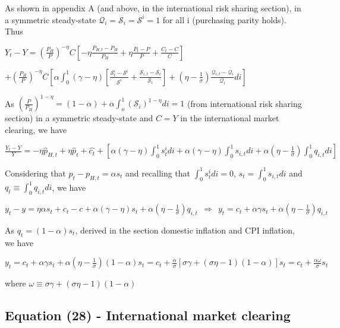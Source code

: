 \documentclass[
]{article}
\begin{document}
As shown in appendix A (and above, in the international risk sharing
section), in a symmetric steady-state
\(\mathcal{Q}_i=\mathcal{S}_i=\mathcal{S}^i=1\) for all i (purchasing
parity holds). Thus

\(\displaystyle Y_t-Y = \left( \frac{P_H}{P} \right)^{-\eta}C \left[ -\eta \frac{P_{H,t}-P_H}{P_H} +\eta \frac{P_{t}-P}{P} + \frac{C_t-C}{C} \right]\)

\(\displaystyle +\left( \frac{P_H}{P} \right)^{-\eta} C \left[\alpha \int_0^1 (\gamma-\eta) \left[ \frac{ \mathcal{S}_{t}^i-\mathcal{S}^i }{\mathcal{S}^i} + \frac{ \mathcal{S}_{i,t}-\mathcal{S}_i }{\mathcal{S}_i}\right] + \left(\eta-\frac{1}{\sigma} \right) \frac{\mathcal{Q}_{i,t}-\mathcal{Q}_i}{\mathcal{Q}_i} di \right]\)

As
\(\displaystyle \left( \frac{P}{P_H} \right)^{1-\eta}=(1-\alpha)+\alpha \int_o^1(\mathcal{S}_i)^{1-\eta}di =1\)
(from international risk sharing section) in a symmetric steady-state
and \(C=Y\) in the international market clearing, we have

\(\displaystyle \frac{Y_t-Y}{Y} = -\eta \hat{p}_{H,t} +\eta \hat{p}_t + \hat{c_t} + \left[\alpha (\gamma-\eta) \int_0^1 s_t^i di + \alpha (\gamma-\eta) \int_0^1 s_{i,t}di + \alpha\left(\eta-\frac{1}{\sigma} \right) \int_0^1 q_{i,t} di \right]\)

Considering that \(p_t-p_{H,t}=\alpha s_t\) and recalling that
\(\displaystyle \int_0^1s_t^idi=0\),
\(\displaystyle s_t= \int_0^1s_{i,t}di\) and
\(\displaystyle q_t \equiv \int_0^1 q_{i,t}di\), we have

\(\displaystyle y_t-y = \eta \alpha s_t +c_t-c + \alpha (\gamma-\eta) s_t + \alpha\left(\eta-\frac{1}{\sigma} \right) q_{i,t} \ \ \Rightarrow \ \ y_t=c_t+ \alpha \gamma s_t + \alpha\left(\eta-\frac{1}{\sigma} \right) q_{i,t}\)

As \(q_t = (1-\alpha)s_t\), derived in the section domestic inflation
and CPI inflation, we have

\(\displaystyle y_t=c_t+ \alpha \gamma s_t + \alpha\left(\eta-\frac{1}{\sigma} \right) (1-\alpha)s_t=c_t+\frac{\alpha}{\sigma}\left[ \sigma \gamma + (\sigma \eta - 1)(1-\alpha) \right] s_t = c_t+\frac{\alpha \omega}{\sigma}s_t\)

where \(\omega \equiv \sigma \gamma + (\sigma \eta - 1)(1-\alpha)\)

\vspace{12pt}

\hypertarget{equation-28---international-market-clearing}{%
\subsection{Equation (28) - International market
clearing}\label{equation-28---international-market-clearing}}
\end{document}
